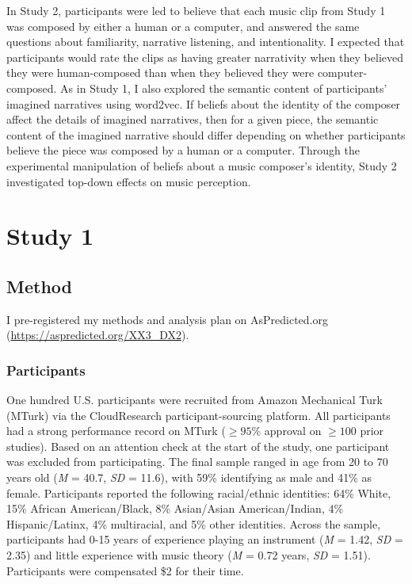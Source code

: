 \documentclass[12pt,twoside]{reedthesis}
\begin{document}
In Study 2, participants were led to believe that each music clip from Study 1 was composed by either a human or a computer, and answered the same questions about familiarity, narrative listening, and intentionality. I expected that participants would rate the clips as having greater narrativity when they believed they were human-composed than when they believed they were computer-composed. As in Study 1, I also explored the semantic content of participants’ imagined narratives using word2vec. If beliefs about the identity of the composer affect the details of imagined narratives, then for a given piece, the semantic content of the imagined narrative should differ depending on whether participants believe the piece was composed by a human or a computer. Through the experimental manipulation of beliefs about a music composer’s identity, Study 2 investigated top-down effects on music perception.  

\chapter*{Study 1}

\section*{Method}
I pre-registered my methods and analysis plan on AsPredicted.org (\url{https://aspredicted.org/XX3_DX2}).
\subsection*{Participants}
One hundred U.S. participants were recruited from Amazon Mechanical Turk (MTurk) via the CloudResearch participant-sourcing platform. All participants had a strong performance record on MTurk ($\ge95\%$ approval on $\ge100$ prior studies). Based on an attention check at the start of the study, one participant was excluded from participating. The final sample ranged in age from 20 to 70 years old (\emph{M} = 40.7, \emph{SD} = 11.6), with 59\% identifying as male and 41\% as female. Participants reported the following racial/ethnic identities: 64\% White, 15\% African American/Black, 8\% Asian/Asian American/Indian, 4\% Hispanic/Latinx, 4\% multiracial, and 5\% other identities. Across the sample, participants had 0-15 years of experience playing an instrument (\emph{M} = 1.42, \emph{SD} = 2.35) and little experience with music theory (\emph{M} = 0.72 years, \emph{SD} = 1.51). Participants were compensated \$2 for their time. 
\end{document}
